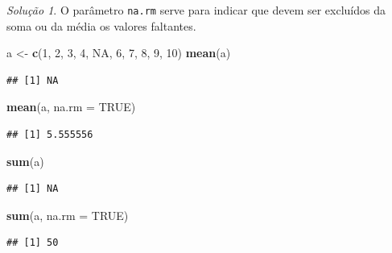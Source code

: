 \documentclass[
]{latex/krantz}
\newenvironment{Shaded}{\begin{snugshade}}{\end{snugshade}}
\newcommand{\AttributeTok}[1]{\textcolor[rgb]{0.13,0.29,0.53}{#1}}
\newcommand{\ConstantTok}[1]{\textcolor[rgb]{0.56,0.35,0.01}{#1}}
\newcommand{\DecValTok}[1]{\textcolor[rgb]{0.00,0.00,0.81}{#1}}
\newcommand{\FunctionTok}[1]{\textcolor[rgb]{0.13,0.29,0.53}{\textbf{#1}}}
\newcommand{\NormalTok}[1]{#1}
\newcommand{\OtherTok}[1]{\textcolor[rgb]{0.56,0.35,0.01}{#1}}
\theoremstyle{definition}
\theoremstyle{definition}
\theoremstyle{definition}
\theoremstyle{definition}
\theoremstyle{remark}
\newtheorem*{solution}{Solução}
\begin{document}
\begin{solution}

O parâmetro \texttt{na.rm} serve para indicar que devem ser excluídos da soma ou da média os valores faltantes.

\begin{Shaded}
\begin{Highlighting}[]
\NormalTok{a }\OtherTok{\textless{}{-}} \FunctionTok{c}\NormalTok{(}\DecValTok{1}\NormalTok{, }\DecValTok{2}\NormalTok{, }\DecValTok{3}\NormalTok{, }\DecValTok{4}\NormalTok{, }\ConstantTok{NA}\NormalTok{, }\DecValTok{6}\NormalTok{, }\DecValTok{7}\NormalTok{, }\DecValTok{8}\NormalTok{, }\DecValTok{9}\NormalTok{, }\DecValTok{10}\NormalTok{)}
\FunctionTok{mean}\NormalTok{(a)}
\end{Highlighting}
\end{Shaded}

\begin{verbatim}
## [1] NA
\end{verbatim}

\begin{Shaded}
\begin{Highlighting}[]
\FunctionTok{mean}\NormalTok{(a, }\AttributeTok{na.rm =} \ConstantTok{TRUE}\NormalTok{)}
\end{Highlighting}
\end{Shaded}

\begin{verbatim}
## [1] 5.555556
\end{verbatim}

\begin{Shaded}
\begin{Highlighting}[]
\FunctionTok{sum}\NormalTok{(a)}
\end{Highlighting}
\end{Shaded}

\begin{verbatim}
## [1] NA
\end{verbatim}

\begin{Shaded}
\begin{Highlighting}[]
\FunctionTok{sum}\NormalTok{(a, }\AttributeTok{na.rm =} \ConstantTok{TRUE}\NormalTok{)}
\end{Highlighting}
\end{Shaded}

\begin{verbatim}
## [1] 50
\end{verbatim}

\end{solution}
\end{document}
